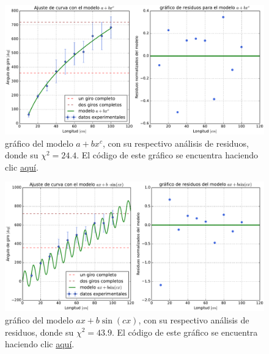 \documentclass{article}
\begin{document}
\begin{figure}[ht]
    \centering
    \includegraphics[scale=0.5]{Informe/img/grafico-modelo-axb.pdf}
    \caption{gráfico del modelo $a + bx^{c}$, con su respectivo análisis de residuos, donde su $\chi^2 = 24.4$. El código de este gráfico se encuentra haciendo clic \href{https://github.com/ayalin7/El-proyectito/blob/main/graficos/grafico-modelo-axb.py}{aquí}.}
    \label{fig:axb}
\end{figure}

\begin{figure}[ht]
    \centering
    \includegraphics[scale=0.5]{Informe/img/grafico-modelo-asinb.pdf}
    \caption{gráfico del modelo $ax + b\sin(cx)$, con su respectivo análisis de residuos, donde su $\chi^2 = 43.9$. El código de este gráfico se encuentra haciendo clic \href{https://github.com/ayalin7/El-proyectito/blob/main/graficos/grafico-modelo-asinb.py}{aquí}.}
    \label{fig:asinb}
\end{figure}
\end{document}
